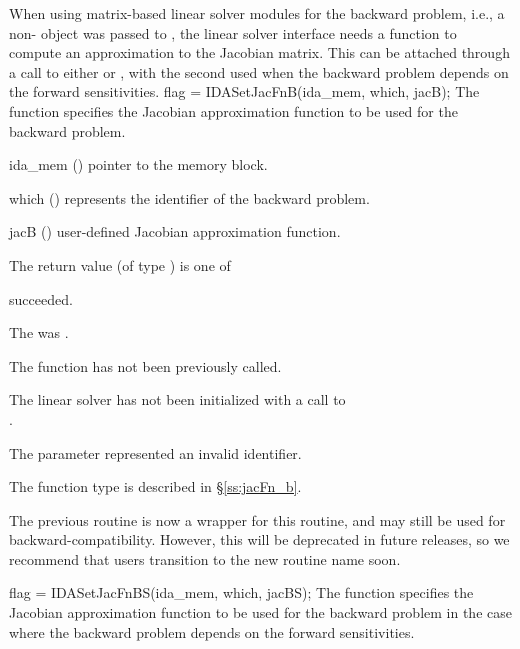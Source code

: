 When using matrix-based linear solver modules for the backward
problem, i.e., a non- {\sunmatrix} object  was passed
to , the {\idals} linear solver interface
needs a function to compute an approximation to the Jacobian matrix.
This can be attached through a call to either  or
, with the second used when the backward problem
depends on the forward sensitivities.
{
  flag = IDASetJacFnB(ida\_mem, which, jacB);
}
{
  The function  specifies the Jacobian
  approximation function to be used for the backward problem.
}
{
  \begin{args}
  \item[ida\_mem] ()
    pointer to the {\idas} memory block.
  \item[which] ()
    represents the identifier of the backward problem.
  \item[jacB] ()
    user-defined Jacobian approximation function.
  \end{args}
}
{
  The return value  (of type ) is one of
  \begin{args}
  \item[\Id{IDALS\_SUCCESS}]
     succeeded.
  \item[\Id{IDALS\_MEM\_NULL}]
    The  was .
  \item[\Id{IDALS\_NO\_ADJ}]
    The function  has not been previously called.
  \item[\Id{IDALS\_LMEM\_NULL}]
    The linear solver has not been initialized with a call to \\ \noindent
    .
  \item[\Id{IDALS\_ILL\_INPUT}]
    The parameter  represented an invalid identifier.
  \end{args}
}
{
  The function type  is described in \S\ref{ss:jacFn_b}.

  The previous routine  is now a wrapper for this
  routine, and may still be used for backward-compatibility.  However,
  this will be deprecated in future releases, so we recommend that
  users transition to the new routine name soon.
}
{
  flag = IDASetJacFnBS(ida\_mem, which, jacBS);
}
{
  The function  specifies the Jacobian
  approximation function to be used for the backward problem in the case
  where the backward problem depends on the forward sensitivities.
}
